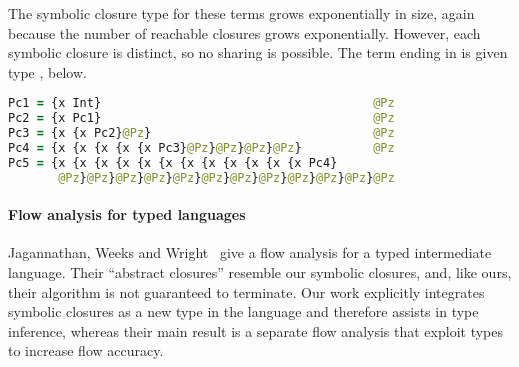 The symbolic closure type for these terms grows exponentially in size, again because 
the number of reachable closures grows exponentially. However, each symbolic closure
is distinct, so no sharing is possible. The term ending in 
is given type , below.

\begin{lstlisting}[language=Clojure]
Pc1 = {x Int}                                      @Pz
Pc2 = {x Pc1}                                      @Pz
Pc3 = {x {x Pc2}@Pz}                               @Pz
Pc4 = {x {x {x {x {x Pc3}@Pz}@Pz}@Pz}@Pz}          @Pz
Pc5 = {x {x {x {x {x {x {x {x {x {x {x {x Pc4}
       @Pz}@Pz}@Pz}@Pz}@Pz}@Pz}@Pz}@Pz}@Pz}@Pz}@Pz}@Pz
\end{lstlisting}

\paragraph{Flow analysis for typed languages}
Jagannathan, Weeks and Wright~\cite{jagannathan1997type}
give a flow analysis for a typed intermediate language.
Their ``abstract closures'' resemble our symbolic closures,
and, like ours, their algorithm is not guaranteed to terminate.
Our work explicitly integrates symbolic closures as a new type
in the language and therefore assists in type inference,
whereas their main result is a separate flow analysis that 
exploit types to increase flow accuracy.




%

